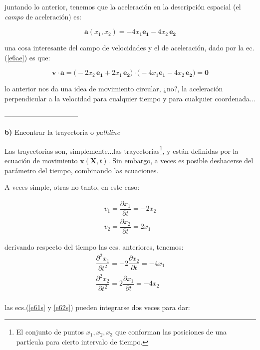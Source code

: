 \documentclass[10pt,a4paper]{article}
\theoremstyle{definition}
\begin{document}
\noindent juntando lo anterior, tenemos que la aceleración en la descripción espacial (el \textit{campo} de aceleración) es:

\begin{equation} \label{e6ae}
\mathbf{a}(x_1,x_2) = -4 x_1 \mathbf{e_1} - 4x_2 \, \mathbf{e_2}  
\end{equation}

\noindent una cosa interesante del campo de velocidades y el de aceleración, dado por la ec.(\ref{e6ae}) es que:


\begin{equation}\nonumber
\mathbf{v} \cdot \mathbf{a} = \Big(-2x_2\, \mathbf{e_1} + 2x_1 \, \mathbf{e_2} \Big) \cdot \Big(-4 x_1 \mathbf{e_1} - 4x_2 \, \mathbf{e_2}\Big) = \mathbf{0}
\end{equation}

\noindent lo anterior nos da una idea de movimiento circular, ¿no?, la aceleración perpendicular a la velocidad para cualquier tiempo y para cualquier coordenada...


--------------------------------


\textbf{b)} Encontrar la trayectoria o \textit{pathline}

Las trayectorias son, simplemente...las trayectorias\footnote{El conjunto de puntos $x_1, x_2, x_3$ que conforman las posiciones de una partícula para cierto intervalo de tiempo.}, y están definidas por la ecuación de movimiento $\mathbf{x}(\mathbf{X}, t)$. Sin embargo, a veces es posible deshacerse del parámetro del tiempo, combinando las ecuaciones.

A veces simple, otras no tanto, en este caso:


\begin{eqnarray}
\label{e61} v_1 = \dfrac{\partial x_1}{\partial t}  = -2 x_2  \\
\label{e62}v_2 = \dfrac{\partial x_2}{\partial t} = 2 x_1 \
\end{eqnarray}




\noindent derivando respecto del tiempo las ecs. anteriores, tenemos:
\begin{eqnarray}
\label{e61s}\dfrac{\partial^2 x_1}{\partial t^2}  = -2 \dfrac{\partial x_2}{\partial t} = -4x_1 \\
\label{e62s}\dfrac{\partial^2 x_2}{\partial t^2}  = 2 \dfrac{\partial x_1}{\partial t} = -4x_2 \\
\end{eqnarray}

\noindent las ecs.(\ref{e61s} y \ref{e62s}) pueden integrarse dos veces para dar:
\end{document}
